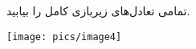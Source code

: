تمامی تعادل‌های زیربازی کامل را بیابید.
\begin{center}
    \texttt{[image: pics/image4]}
\end{center}